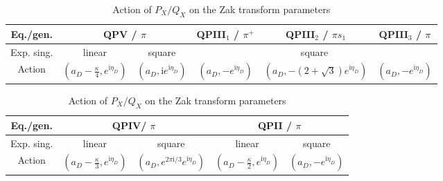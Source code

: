 \documentclass[12pt,a4paper]{article}
\numberwithin{equation}{section}
\newcommand{\ri}{\mathrm{i}}
\newcommand{\D}{\scriptscriptstyle{D}}
\begin{document}
\begin{table}[ht]
    \centering
    \begin{tabular}{|c||c|c|c|c|c|}
      \hline Eq./gen. & \multicolumn{2}{|c|}{QPV / $\pi$} & QPIII$_1$ / $\pi^+$ & QPIII$_2$ / $\pi s_1$ & QPIII$_3$ / $\pi$ \\
      \hline
      Exp. sing. & linear & square &  \multicolumn{3}{|c|}{square} \\   
      \hline
      Action & $(a_{\D}{-}\frac{\kappa}4,e^{\ri\eta_{\D}})$ & $(a_{\D},\ri e^{\ri\eta_{\D}})$ & $(a_{\D},-e^{\ri\eta_{\D}})$ & $(a_{\D},-(2{+}\sqrt3)e^{\ri\eta_{\D}})$ & $(a_{\D},-e^{\ri\eta_{\D}})$ \\
      \hline
    \end{tabular}

   \vspace{0.7cm}
    
    \begin{tabular}{|c||c|c|c|c|}
      \hline Eq./gen. & \multicolumn{2}{|c|}{QPIV/ $\pi$} & \multicolumn{2}{|c|}{QPII / $\pi$} \\
      \hline
      Exp. sing. & linear & square & linear & square \\   
      \hline
      Action & $(a_{\D}{-}\frac{\kappa}3,e^{\ri\eta_{\D}})$ & $(a_{\D},e^{2\pi\ri/3} e^{\ri\eta_{\D}})$ & $(a_{\D}{-}\frac{\kappa}2,e^{\ri\eta_{\D}})$ & $(a_{\D},- e^{\ri\eta_{\D}})$\\
      \hline
    \end{tabular}
    \caption{Action of $P_X/Q_X$ on the Zak transform parameters}
    \label{tab:nonaut_Zak_strong}
\end{table}
\end{document}
